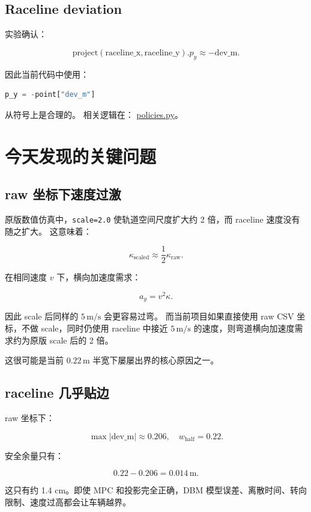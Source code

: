 \documentclass[UTF8]{ctexart}
\begin{document}
\subsection{Raceline deviation}

实验确认：

\[
\mathrm{project}(\mathrm{raceline\_x}, \mathrm{raceline\_y}).p_y \approx -\mathrm{dev\_m}.
\]

因此当前代码中使用：

\begin{lstlisting}[language=Python]
p_y = -point["dev_m"]
\end{lstlisting}

从符号上是合理的。
相关逻辑在：
\href{https://github.com/CrazalDaver/racer-LLM/blob/main/policies.py}{policies.py}。

\section{今天发现的关键问题}

\subsection{raw 坐标下速度过激}

原版数值仿真中，\texttt{scale=2.0} 使轨道空间尺度扩大约 2 倍，而 raceline 速度没有随之扩大。
这意味着：

\[
\kappa_{\mathrm{scaled}} \approx \frac{1}{2}\kappa_{\mathrm{raw}}.
\]

在相同速度 $v$ 下，横向加速度需求：

\[
a_y = v^2 \kappa.
\]

因此 scale 后同样的 $5\,\mathrm{m/s}$ 会更容易过弯。
而当前项目如果直接使用 raw CSV 坐标，不做 scale，同时仍使用 raceline 中接近 $5\,\mathrm{m/s}$ 的速度，则弯道横向加速度需求约为原版 scale 后的 2 倍。

这很可能是当前 $0.22\,\mathrm{m}$ 半宽下屡屡出界的核心原因之一。

\subsection{raceline 几乎贴边}

raw 坐标下：

\[
\max|\mathrm{dev\_m}| \approx 0.206,
\quad
w_{\mathrm{half}} = 0.22.
\]

安全余量只有：

\[
0.22 - 0.206 = 0.014\,\mathrm{m}.
\]

这只有约 1.4 cm。即使 MPC 和投影完全正确，DBM 模型误差、离散时间、转向限制、速度过高都会让车辆越界。
\end{document}
